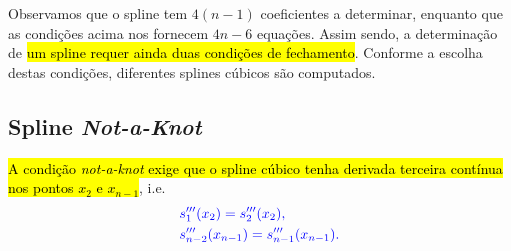 Observamos que o spline tem $4(n-1)$ coeficientes a determinar, enquanto que as condições acima nos fornecem $4n-6$ equações. Assim sendo, a determinação de \hl{um spline requer ainda duas condições de fechamento}. Conforme a escolha destas condições, diferentes splines cúbicos são computados.

\subsection{Spline {\it Not-a-Knot}}

\hl{A condição \textit{not-a-knot} exige que o spline cúbico tenha derivada terceira contínua nos pontos $x_2$ e $x_{n-1}$}, i.e.
\begin{subequations}\hleq
  \begin{align}
    &s_1'''(x_2) = s_2'''(x_2),\\
    &s_{n-2}'''(x_{n-1}) = s_{n-1}'''(x_{n-1}).
  \end{align}
\end{subequations}

